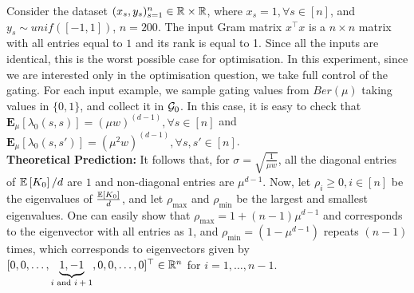 Consider the dataset $(x_s,y_s)_{s=1}^n\in \mathbb{R}\times \mathbb{R}$, where $x_s=1,\forall s\in [n]$, and $y_s\sim unif([-1,1])$, $n=200$. The input Gram matrix $x^\top x$ is a $n\times n$ matrix with all entries equal to $1$ and its rank is equal to 1. Since all the inputs are identical, this is the worst possible case for optimisation. In this experiment, since we are interested only in the optimisation question, we take full control of the gating. For each input example, we sample gating values from $Ber(\mu)$ taking values in $\{0,1\}$, and collect it in $\mathcal{G}_0$. In this case, it is easy to check that $\mathbf{E}_{\mu}\left[\lambda_0(s,s)\right]=(\mu w)^{(d-1)},\forall s\in[n]$ and $\mathbf{E}_{\mu}\left[\lambda_0(s,s')\right]=(\mu^2 w)^{(d-1)},\forall s,s'\in[n]$.\hfill\\
\textbf{Theoretical Prediction:} It follows that,  for $\sigma=\sqrt{\frac{1}{\mu w}}$, all the diagonal entries of $\mathbb{E}\left[K_0\right]/d$ are $1$ and non-diagonal entries are $\mu^{d-1}$. Now, let $\rho_i\geq 0,i \in [n]$ be the eigenvalues of $\frac{\mathbb{E}\left[K_0\right]}{d}$, and let $\rho_{\max}$ and $\rho_{\min}$ be the largest and smallest eigenvalues.  One can easily show that $\rho_{\max}=1+(n-1)\mu^{d-1}$ and corresponds to the eigenvector with all entries as $1$, and $\rho_{\min}=(1-\mu^{d-1})$ repeats $(n-1)$ times, which corresponds to eigenvectors given by $[0, 0, \ldots, \underbrace{1, -1}_{\text{$i$ and $i+1$}}, 0,0,\ldots, 0]^\top \in \mathbb{R}^n$ for $i=1,\ldots,n-1$.\hfill\\
